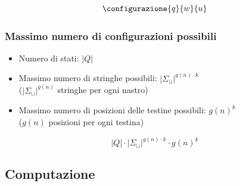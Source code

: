 \[
\configurazione{q}{w}{u}
\]

\subsubsection{Massimo numero di configurazioni possibili}
\begin{itemize}
    \item Numero di stati: $|Q|$
    \item Massimo numero di stringhe possibili: $|\Sigma_\sqcup|^{g(n) \cdot k}$ \\
    ($|\Sigma_\sqcup|^{g(n)}$ stringhe per ogni nastro)
    \item Massimo numero di posizioni delle testine possibili: $g(n)^k$ \\
    ($g(n)$ posizioni per ogni testina)
\end{itemize}

{\[|Q| \cdot |{\Sigma_\sqcup|}^{g(n) \cdot k} \cdot g(n)^k\]}


\subsection{Computazione}

